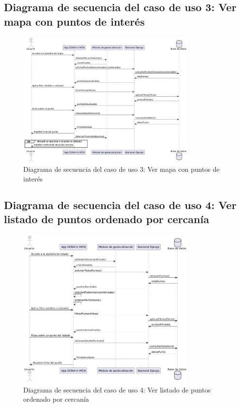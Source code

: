 \subsection{Diagrama de secuencia del caso de uso 3: Ver mapa con puntos de interés}
\begin{figure}[H]
    \centering
    \includegraphics[width=0.8\textwidth]{figs/caso3.png}
    \caption{Diagrama de secuencia del caso de uso 3: Ver mapa con puntos de interés}
\end{figure}

\subsection{Diagrama de secuencia del caso de uso 4: Ver listado de puntos ordenado por cercanía}
\begin{figure}[H]
    \centering
    \includegraphics[width=0.8\textwidth]{figs/caso4.png}
    \caption{Diagrama de secuencia del caso de uso 4: Ver listado de puntos ordenado por cercanía}
\end{figure}

